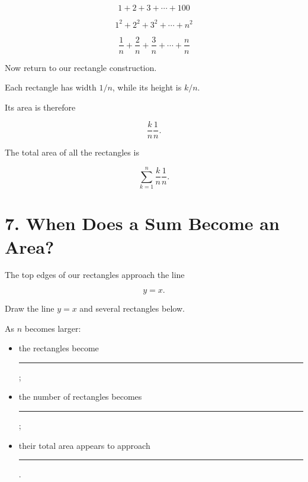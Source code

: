 \documentclass[11pt]{article}
\begin{document}
\[
1+2+3+\cdots+100
\]

\vspace{0.25in}

\[
1^2+2^2+3^2+\cdots+n^2
\]

\vspace{0.25in}

\[
\frac1n+\frac2n+\frac3n+\cdots+\frac nn
\]

\vspace{0.35in}


Now return to our rectangle construction.

Each rectangle has width \(1/n\), while its height is \(k/n\).

Its area is therefore

\[
\frac{k}{n}\frac1n.
\]

The total area of all the rectangles is

\[
\boxed{
\sum_{k=1}^{n}
\frac{k}{n}\frac1n
}.
\]


\newpage
\section{7. When Does a Sum Become an Area?}

The top edges of our rectangles approach the line

\[
y=x.
\]

Draw the line \(y=x\) and several rectangles below.

\begin{center}
\end{center}


As \(n\) becomes larger:

\begin{itemize}[leftmargin=*]

\item the rectangles become \rule{1.2in}{0.4pt};

\item the number of rectangles becomes \rule{1.2in}{0.4pt};

\item their total area appears to approach \rule{1.2in}{0.4pt}.

\end{itemize}
\end{document}
